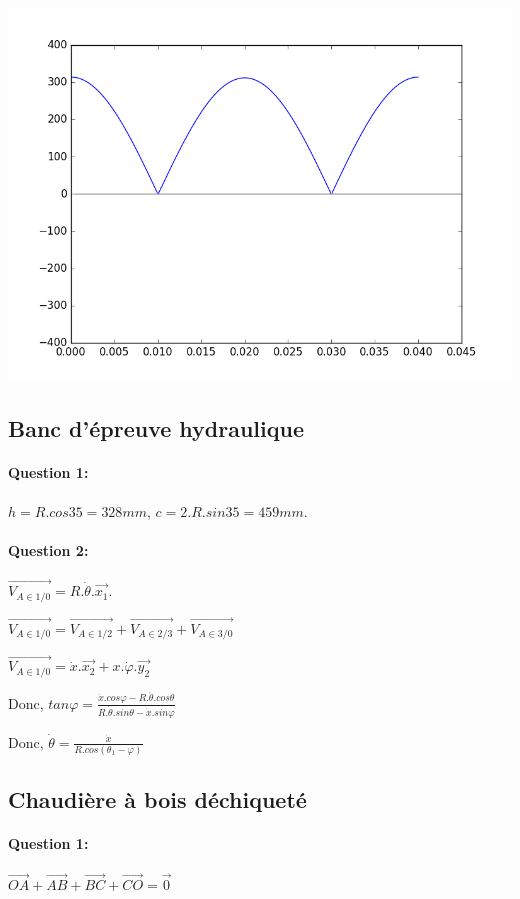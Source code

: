 \begin{center}
 \includegraphics[width=0.7\linewidth]{img/figure_3}
\end{center}

\subsection{Banc d'épreuve hydraulique}

\paragraph{Question 1:} $h=R.cos 35=328mm$, $c=2.R.sin35=459mm$.

\paragraph{Question 2:} $\overrightarrow{V_{A\in1/0}}=R.\dot{\theta}.\overrightarrow{x_1}$.

$\overrightarrow{V_{A\in1/0}}=\overrightarrow{V_{A\in1/2}}+\overrightarrow{V_{A\in2/3}}+\overrightarrow{V_{A\in3/0}}$

$\overrightarrow{V_{A\in1/0}}=\dot{x}.\overrightarrow{x_2}+x.\dot{\varphi}.\overrightarrow{y_2}$

Donc, $tan\varphi=\frac{\dot{x}.cos\varphi-R.\dot{\theta}.cos\theta}{R.\dot{\theta}.sin\theta-\dot{x}.sin\varphi}$

Donc, $\dot{\theta}=\frac{\dot{x}}{R.cos(\theta_1-\varphi)}$

\subsection{Chaudière à bois déchiqueté}
 
\paragraph{Question 1:} $\overrightarrow{OA}+\overrightarrow{AB}+\overrightarrow{BC}+\overrightarrow{CO}=\overrightarrow{0}$
 
